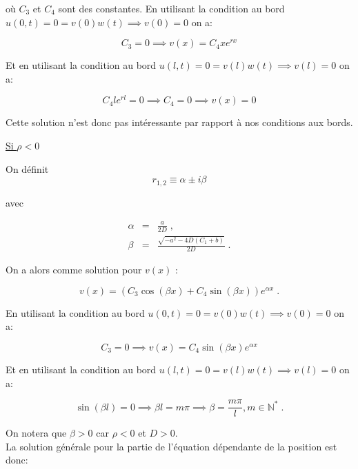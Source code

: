 \documentclass[a4paper, 12pt]{report}
\begin{document}
où $C_3$ et $C_4$ sont des constantes. En utilisant la condition au bord
$u(0,t) = 0 = v(0) w(t) \implies v(0) = 0$ on a:

\begin{equation}
  C_3 = 0 \implies   v(x) = C_4 x e^{r x}
\end{equation}

Et en utilisant la condition au bord $u(l,t) = 0 = v(l) w(t) \implies v(l) = 0$ on a:

\begin{equation}
  C_4 l e^{r l} = 0 \implies C_4 = 0 \implies v(x) = 0
\end{equation}

Cette solution n'est donc pas intéressante par rapport à nos conditions aux bords.

\underline{Si $\rho < 0$}

On définit
\begin{equation}
r_{1,2} \equiv \alpha \pm i \beta
\end{equation}

avec

\begin{eqnarray}
  \alpha & = & \frac{a}{2 D}\;,\\
  \beta & = & \frac{\sqrt{-a^{2} - 4 D (C_{1} + b)}}{2 D}\;.\label{beta}
\end{eqnarray}

On a alors comme solution pour $v(x)$ :

\begin{equation}
  v(x) = (C_3 \cos(\beta x) + C_4 \sin(\beta x)) e^{\alpha x}\;.
\end{equation}

En utilisant la condition au bord $u(0,t) = 0 = v(0) w(t) \implies v(0) = 0$ on a:

\begin{equation}
  C_3 = 0 \implies v(x) = C_4 \sin(\beta x) e^{\alpha x}
\end{equation}

Et en utilisant la condition au bord $u(l,t) = 0 = v(l) w(t) \implies v(l) = 0$ on a:

\begin{equation}
  \sin(\beta l) = 0 \implies \beta l = m \pi \implies \beta = \frac{m \pi}{l}, m \in \mathbb{N}^{\ast}\;.
\end{equation}

On notera que $\beta > 0$ car $\rho < 0$ et $D > 0$. \\
La solution générale pour la partie de l'équation dépendante de la position est
donc:
\end{document}
